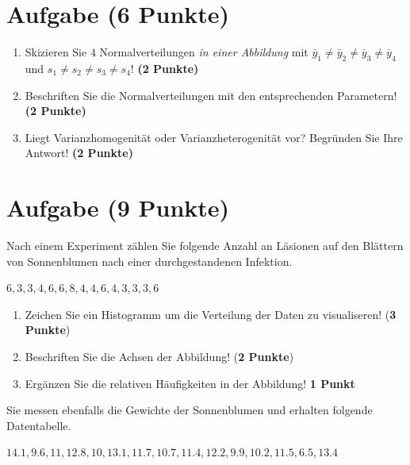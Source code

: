\documentclass[a4paper, 10pt]{scrartcl}\usepackage[]{graphicx}\usepackage[]{xcolor}
\begin{document}
 
\clearpage

\section{Aufgabe \hfill (6 Punkte)}



\begin{enumerate}
\item Skizieren Sie $4$ Normalverteilungen \textit{in einer
    Abbildung} mit $\bar{y}_1 \neq \bar{y}_2 \neq \bar{y}_3 \neq \bar{y}_4$ und $s_1 \neq s_2 \neq s_3 \neq s_4$! \textbf{(2 Punkte)}
\item Beschriften Sie die Normalverteilungen mit den entsprechenden
  Parametern! \textbf{(2 Punkte)}
\item Liegt Varianzhomogenit{\"a}t oder Varianzheterogenit{\"a}t vor? Begr{\"u}nden Sie
  Ihre Antwort! \textbf{(2 Punkte)}
\end{enumerate}

 
\clearpage

\section{Aufgabe \hfill (9 Punkte)}



Nach einem Experiment z{\"a}hlen Sie folgende Anzahl an L{\"a}sionen auf den
Bl{\"a}ttern von Sonnenblumen nach einer durchgestandenen Infektion. 

\begin{center}
$6, 3, 3, 4, 6, 6, 8, 4, 4, 6, 4, 3, 3, 3, 6$
\end{center}

\begin{enumerate}
\item Zeichen Sie ein Histogramm um die Verteilung der Daten zu visualiseren! (\textbf{3 Punkte})
\item Beschriften Sie die Achsen der Abbildung! (\textbf{2 Punkte})
\item Erg{\"a}nzen Sie die relativen H{\"a}ufigkeiten in der Abbildung! \textbf{1
    Punkt}  
\end{enumerate}

Sie messen ebenfalls die Gewichte der Sonnenblumen und erhalten folgende Datentabelle.

\begin{center}
$14.1, 9.6, 11, 12.8, 10, 13.1, 11.7, 10.7, 11.4, 12.2, 9.9, 10.2, 11.5, 6.5, 13.4$
\end{center}
\end{document}
